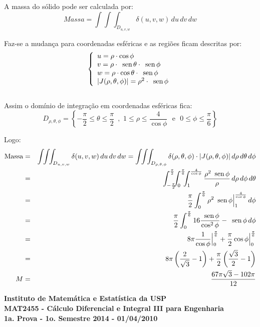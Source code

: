 \documentclass[12pt,a4paper]{article}
\newcommand{\sen}{\mbox{\, sen}\,}
\begin{document}
A massa do sólido pode ser calculada por:
$$ Massa = \int\!\!\int\!\!\int_{D_{u,v,w}} \delta(u,v,w)\,du\,dv\,dw $$

Faz-se a mudança para coordenadas esféricas e as regiões ficam descritas por:
$$\left\{\begin{array}{lc}
u=\rho \cdot \cos{\phi}\\
v=\rho \cdot \sen{\theta}\cdot \sen{\phi}\\
w=\rho \cdot \cos{\theta}\cdot \sen{\phi} \\
|J(\rho,\theta,\phi)|=\rho^2 \cdot \sen{\phi}
\end{array}\right.
$$
\\
Assim o domínio de integração em coordenadas esféricas fica:\\
$$D_{\rho,\theta,\phi}= \left\{-\frac{\pi}{2} \leq \theta \leq \frac{\pi}{2}\, \,\, , \,\, 1 \leq \rho \leq \frac{4}{\cos{\phi}}\, \, \mbox{  e  } 
\,\,0 \leq \phi \leq \frac{\pi}{6}\right\}$$

Logo:
\begin{eqnarray*}
\mbox{Massa} &=& \int\!\!\int\!\!\int_{D_{u,v,w}} \delta(u,v,w)\,du\,dv\,dw = \int\!\!\int\!\!\int_{D_{\rho,\theta,\phi}} \delta(\rho,\theta,\phi)\cdot |J(\rho,\theta,\phi)|\,d\rho\,d\theta\,d\phi\\
&=& \int_{-\frac{\pi}{2}}^{\frac{\pi}{2}}\!\!\!\int_{0}^{\frac{\pi}{6}}\!\!\!\int_1^{\frac{4}{\cos{\phi}}}\frac{\rho^2\sen{\phi}}{\rho}\,d\rho\,d\phi\,d\theta\\
&=& \frac{\pi}{2} \int_0^{\frac{\pi}{6}} \rho^2\sen{\phi}\Big|_1^{\frac{4}{\cos{\phi}}}\,d\phi\\
&=& \frac{\pi}{2} \int_0^{\frac{\pi}{6}} 16\frac{\sen{\phi}}{\cos^2{\phi}}-\sen{\phi}\,d\phi\\
&=& 8\pi \frac{1}{\cos{\phi}}\Big|_0^{\frac{\pi}{6}} + \frac{\pi}{2}\cos{\phi}\Big|_0^{\frac{\pi}{6}}\\
&=& 8\pi\left(\frac{2}{\sqrt{3}}-1\right) + \frac{\pi}{2}\left(\frac{\sqrt{3}}{2}-1\right)\\
M &=& \frac{67\pi \sqrt{3}-102 \pi}{12}
\end{eqnarray*}



\newpage
\begin{center}
\textbf{Instituto de Matemática e Estatística da USP\\
MAT2455 - Cálculo Diferencial e Integral III para Engenharia\\}
\textbf{1a. Prova - 1o. Semestre 2014 - 01/04/2010}
\end{center}
\end{document}
